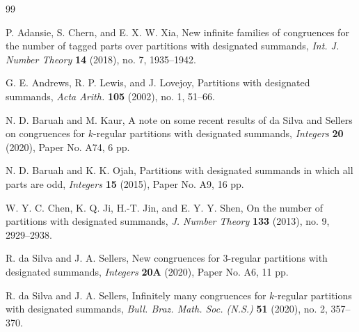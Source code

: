 \documentclass[12pt,reqno]{amsart}
\numberwithin{equation}{section}
\theoremstyle{theorem}
\theoremstyle{definition}
\begin{document}
\begin{thebibliography}{99}





P. Adansie, S. Chern, and E. X. W. Xia, 
New infinite families of congruences for the number of tagged parts over partitions with designated summands, 
\textit{Int. J. Number Theory} \textbf{14} (2018), no. 7, 1935--1942.

G. E. Andrews, R. P. Lewis, and J. Lovejoy, 
Partitions with designated summands, \textit{Acta Arith.} \textbf{105} (2002), no. 1, 51--66.

N. D. Baruah and M. Kaur, A note on some recent results of da Silva and Sellers on congruences for $k$-regular partitions with designated summands, \textit{Integers} \textbf{20} (2020), Paper No. A74, 6 pp.

N. D. Baruah and K. K. Ojah, Partitions with designated summands in which all parts are odd, \textit{Integers} \textbf{15} (2015), Paper No. A9, 16 pp.



W. Y. C. Chen, K. Q. Ji, H.-T. Jin, and E. Y. Y. Shen, On the number of partitions with designated summands, \textit{J. Number Theory} \textbf{133} (2013), no. 9, 2929--2938.

R. da Silva and J. A. Sellers, New congruences for $3$-regular partitions with designated summands, \textit{Integers} \textbf{20A} (2020), Paper No. A6, 11 pp.

R. da Silva and J. A. Sellers, Infinitely many congruences for $k$-regular partitions with designated summands, \textit{Bull. Braz. Math. Soc. (N.S.)} \textbf{51} (2020), no. 2, 357--370.


\end{thebibliography}
\end{document}
